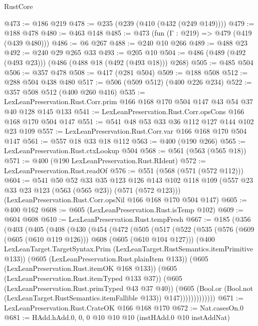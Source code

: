 \begin{lexlean}{RustCore}
\begin{coremodule}
@473 := @186 @219
@478 := @235 (@239 (@410 (@432 (@249 @149))))
@479 := @188 @478
@480 := @463 @148
@485 := @473 (fun (Γ : @219) => @479 (@419 (@439 @480)))
@486 := @6 @267
@488 := @240 @10 @266
@489 := @488 @23
@492 := @240 @29 @265 @33
@493 := @205 @10
@504 := @486 (@489 (@492 (@493 @23))) (@486 (@488 @18 (@492 (@493 @18))) @268)
@505 := @485 @504
@506 := @357 @478
@508 := @417 (@281 @504)
@509 := @188 @508
@512 := @288 @504 @438 @480
@517 := @506 (@509 @512) (@400 @226 @234)
@522 := @357 @508 @512 (@400 @260 @416)
@535 := LexLeanPreservation.Rust.Corr.prim @166 @168 @170 @504 @147 @43 @54 @37 @40 @128 @145 @133
@541 := LexLeanPreservation.Rust.Corr.opsCons @166 @168 @170 @504 @147
@551 := @541 @48 @53 @33 @36 @112 @127 @144 @102 @23 @109
@557 := LexLeanPreservation.Rust.Corr.var @166 @168 @170 @504 @147
@561 := @557 @18 @33 @18 @112
@563 := @400 (@190 @266)
@565 := LexLeanPreservation.Rust.ctxLookup @504
@568 := @561 (@563 (@565 @18))
@571 := @400 (@190 LexLeanPreservation.Rust.RIdent)
@572 := LexLeanPreservation.Rust.readOf
@576 := @551 (@568 (@571 (@572 @112)))
@604 := @541
    @50
    @52
    @33
    @35
    @123
    @126
    @143
    @102
    @118
    @109
    (@557 @23 @33 @23 @123 (@563 (@565 @23)) (@571 (@572 @123)))
    (LexLeanPreservation.Rust.Corr.opsNil @166 @168 @170 @504 @147)
@605 := @400 @162
@608 := @605 (LexLeanPreservation.Rust.isTemp @102)
@609 := @604 @608
@610 := LexLeanPreservation.Rust.tempFresh
@667 := @185
    (@356
      (@403
        (@405
          (@408
            (@430
              (@454
                (@472
                  (@505
                    (@517
                      (@522
                        (@535
                          (@576 (@609 (@605 (@610 @119 @126))) @608 (@605 (@610 @104 @127)))
                          (@400
                            LexLeanTarget.TargetSyntax.Prim
                            (LexLeanTarget.RustSemantics.itemPrimitive @133))
                          (@605 (LexLeanPreservation.Rust.plainItem @133))
                          (@605 (LexLeanPreservation.Rust.itemOK @168 @133))
                          (@605 (LexLeanPreservation.Rust.itemTyped @133 @37))
                          (@605 (LexLeanPreservation.Rust.primTyped @43 @37 @40))
                          (@605
                            (Bool.or
                              (Bool.not (LexLeanTarget.RustSemantics.itemFallible @133))
                              @147)))))))))))))
@671 := LexLeanPreservation.Rust.CrateOK @166 @168 @170
@672 := Nat.casesOn.{0}
@681 := HAdd.hAdd.{0, 0, 0} @10 @10 @10 (instHAdd.{0} @10 instAddNat)

\end{coremodule}
\end{lexlean}
